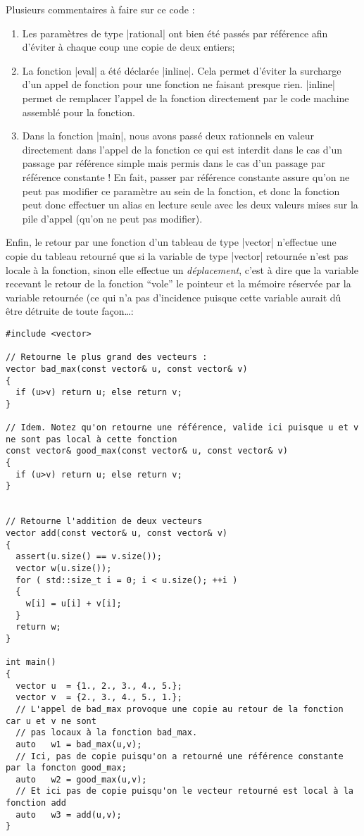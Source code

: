 Plusieurs commentaires à faire sur ce code :
\begin{enumerate}
    \item Les paramètres de type |rational| ont bien été passés par référence afin d'éviter à chaque coup une copie de deux entiers;
    \item La fonction |eval| a été déclarée |inline|. Cela permet d'éviter la surcharge d'un appel de fonction pour une fonction ne faisant presque rien. |inline| permet de remplacer l'appel de la fonction directement par le code machine assemblé pour la fonction. 
    \item Dans la fonction |main|, nous avons passé deux rationnels en valeur directement dans l'appel de la fonction ce qui est interdit dans le cas d'un passage par référence simple mais permis dans le cas d'un passage par référence constante ! En fait, passer par référence constante assure qu'on ne peut pas modifier ce paramètre au sein de la fonction, et donc la fonction peut donc effectuer un alias en lecture seule avec les deux valeurs mises sur la pile d'appel (qu'on ne peut pas modifier).
\end{enumerate}

Enfin, le retour par une fonction d'un tableau de type |vector| n'effectue une copie du tableau retourné
que si la variable de type |vector| retournée n'est pas locale à la fonction, sinon
elle effectue un \textsl{déplacement}, c'est à dire que la variable recevant le retour de la fonction ``vole'' le pointeur et la mémoire réservée par la variable retournée (ce qui n'a pas d'incidence puisque cette variable aurait dû être détruite de toute façon\ldots :

\begin{lstlisting}[caption=retour d'une variable de type vector]
#include <vector>

// Retourne le plus grand des vecteurs :
vector bad_max(const vector& u, const vector& v)
{
  if (u>v) return u; else return v;
}

// Idem. Notez qu'on retourne une référence, valide ici puisque u et v ne sont pas local à cette fonction
const vector& good_max(const vector& u, const vector& v)
{
  if (u>v) return u; else return v;
}


// Retourne l'addition de deux vecteurs
vector add(const vector& u, const vector& v)
{
  assert(u.size() == v.size());
  vector w(u.size());
  for ( std::size_t i = 0; i < u.size(); ++i )
  {
    w[i] = u[i] + v[i];
  }
  return w;
}

int main()
{
  vector u  = {1., 2., 3., 4., 5.};
  vector v  = {2., 3., 4., 5., 1.};
  // L'appel de bad_max provoque une copie au retour de la fonction car u et v ne sont
  // pas locaux à la fonction bad_max.
  auto   w1 = bad_max(u,v);
  // Ici, pas de copie puisqu'on a retourné une référence constante par la foncton good_max;
  auto   w2 = good_max(u,v);
  // Et ici pas de copie puisqu'on le vecteur retourné est local à la fonction add
  auto   w3 = add(u,v);
}
\end{lstlisting}

